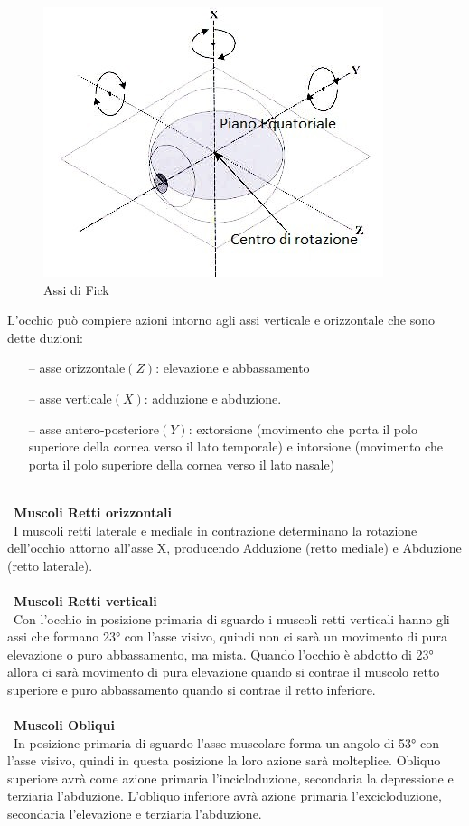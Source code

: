 \begin{figure}[h!]
	\centering
	\includegraphics[scale=0.49]{source/immagini/Assi.jpg}
	\caption[figure]{Assi di Fick}
	\label{fig:issuexample}
\end{figure}

L’occhio può compiere azioni intorno agli assi verticale e orizzontale che sono dette duzioni:
 \begin{itemize}
 \itemsep-0.5em 
 \item[--]asse orizzontale$(Z)$: elevazione e abbassamento
 \item[--]asse verticale$(X)$: adduzione e abduzione.
 \item[--]asse antero-posteriore$(Y)$: extorsione (movimento che porta il polo superiore della cornea verso il lato temporale) e intorsione (movimento che porta il polo superiore della cornea verso il lato nasale)
 \end{itemize}
\\\ 
\textbf{Muscoli Retti orizzontali}
\\\
I muscoli retti laterale e mediale in contrazione determinano la rotazione dell’occhio attorno all’asse X, producendo Adduzione (retto mediale) e Abduzione (retto laterale).
\\\ \\\	
\textbf{Muscoli Retti verticali}
\\\
Con l’occhio in posizione primaria di sguardo i muscoli retti verticali hanno gli assi che formano 23° con l’asse visivo, quindi non ci sarà un movimento di pura elevazione o puro abbassamento, ma mista. Quando l’occhio è abdotto di 23° allora ci sarà movimento di pura elevazione quando si contrae il muscolo retto superiore e puro abbassamento quando si contrae il retto inferiore.
\\\ \\\
\textbf{Muscoli Obliqui}
\\\ 
In posizione primaria di sguardo l’asse muscolare forma un angolo di 53° con l’asse visivo, quindi in questa posizione la loro azione sarà molteplice. Obliquo superiore avrà come azione primaria l’incicloduzione, secondaria la depressione e terziaria l’abduzione. L’obliquo inferiore avrà azione primaria l’excicloduzione, secondaria l’elevazione e terziaria l’abduzione. 

